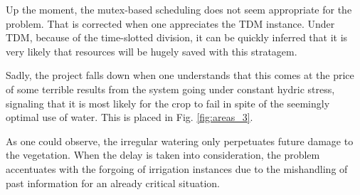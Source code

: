 \documentclass[12pt]{article}
\begin{document}
Up the moment, the mutex-based scheduling does not seem appropriate for the problem. That is corrected when one appreciates the TDM instance. Under TDM, because of the time-slotted division, it can be quickly inferred that it is very likely that resources will be hugely saved with this stratagem. 

Sadly, the project falls down when one understands that this comes at the price of some terrible results from the system going under constant hydric stress, signaling that it is most likely for the crop to fail in spite of the seemingly optimal use of water. This is placed in Fig. \ref{fig:areas_3}.

As one could observe, the irregular watering only perpetuates future damage to the vegetation. When the delay is taken into consideration, the problem accentuates with the forgoing of irrigation instances due to the mishandling of past information for an already critical situation.
\end{document}
